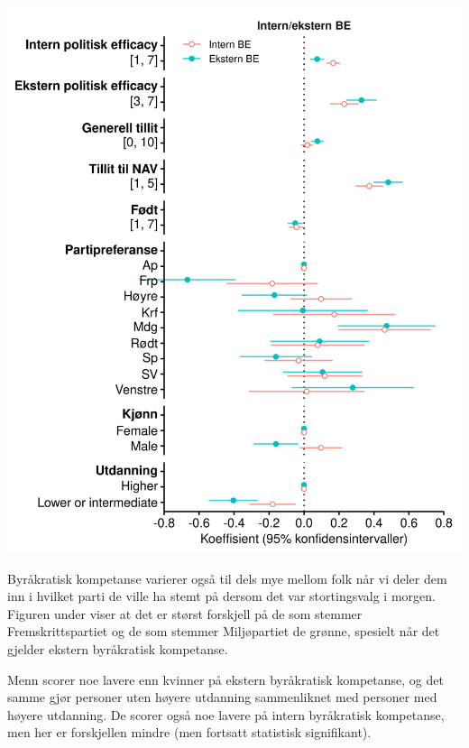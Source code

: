 \documentclass[
]{book}
\begin{document}
\includegraphics{figs/png/fig_be_coefs_by_type.png}

Byråkratisk kompetanse varierer også til dels mye mellom folk når vi deler dem inn i hvilket parti de ville ha stemt på dersom det var stortingsvalg i morgen.
Figuren under viser at det er størst forskjell på de som stemmer Fremskrittspartiet og de som stemmer Miljøpartiet de grønne, spesielt når det gjelder ekstern byråkratisk kompetanse.

Menn scorer noe lavere enn kvinner på ekstern byråkratisk kompetanse, og det samme gjør personer uten høyere utdanning sammenliknet med personer med høyere utdanning.
De scorer også noe lavere på intern byråkratisk kompetanse, men her er forskjellen mindre (men fortsatt statistisk signifikant).
\end{document}
